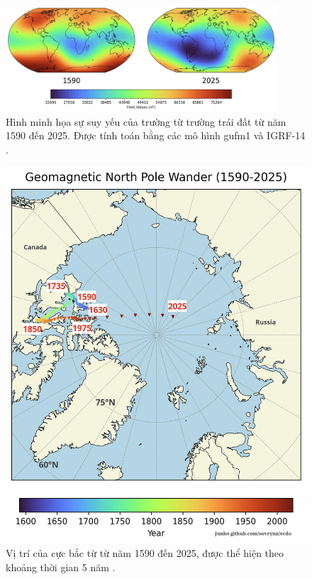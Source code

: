 \documentclass[10pt,twocolumn,letterpaper]{article}
\begin{document}
\begin{figure}[t]
\begin{center}
\includegraphics[width=0.9\textwidth]{saa.jpg}
\end{center}
   \caption{Hình minh họa sự suy yếu của trường từ trường trái đất từ năm 1590 đến 2025. Được tính toán bằng các mô hình gufm1 và IGRF-14 \cite{125,126}.}
\label{fig:14}
\end{figure}

\begin{figure}[t]
\begin{center}
   \includegraphics[width=1\linewidth]{npw.jpg}
\end{center}
   \caption{Vị trí của cực bắc từ từ năm 1590 đến 2025, được thể hiện theo khoảng thời gian 5 năm \cite{142}.}
\label{fig:13}
\label{fig:onecol}
\end{figure}
\end{document}
